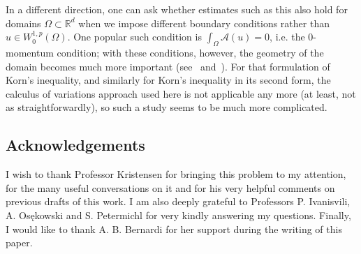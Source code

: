 \documentclass[11pt, a4paper]{amsart}
\theoremstyle{definition}
\theoremstyle{remark}
\newcommand{\R}{\mathbb{R}}
\begin{document}
In a different direction, one can ask whether estimates such as 
this also hold for domains $\Omega\subset \R^d$ when we impose 
different boundary conditions rather than 
$u\in W^{1,p}_0(\Omega)$. One popular such condition is
$\int_\Omega \mathcal A(u)=0$, i.e. the $0$-momentum condition; 
with these conditions, however, the
geometry of the domain becomes much more important
(see~\cite{JohnKorn} and~\cite{Lewicka2016OnConditions}).
For that formulation of Korn's inequality,
and similarly for Korn's inequality in its second form,
the calculus of variations approach used here
is not applicable any more
(at least, not as straightforwardly),
so such a study seems to be much more complicated.
\subsection*{Acknowledgements}
I wish to thank Professor Kristensen 
for bringing this problem to my attention,
for the many useful conversations on it
and for his very helpful comments
on previous drafts of this work.
I am also deeply grateful to
Professors P. Ivanisvili, A. Osękowski
and S. Petermichl for very kindly
answering my questions.
Finally, I would like to thank 
A. B. Bernardi for her support
during the writing of this paper.
\printbibliography
\end{document}
